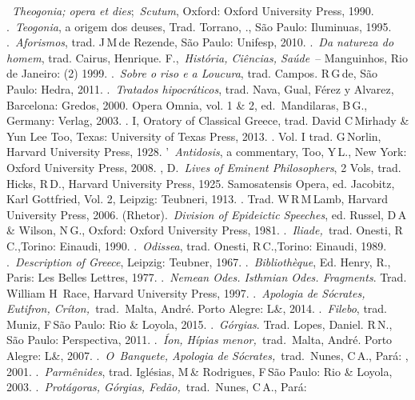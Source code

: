 \begin{bibliohedra}
~\emph{Theogonia; opera et dies};~\emph{Scutum}, Oxford: Oxford
  University Press, 1990.
.~\emph{Teogonia}, a origem dos deuses, Trad. Torrano, .,
  São Paulo: Iluminuas, 1995.
.~\emph{Aforismos}, trad. J\,M\,de Rezende, São Paulo:
  Unifesp, 2010.
.~\emph{Da natureza do homem}, trad. Cairus, Henrique.
  F.,~\emph{História, Ciências, Saúde}~-- Manguinhos, Rio de Janeiro: 
  (2) 1999.
.~\emph{Sobre o riso e a Loucura}, trad. Campos. R\,G\,de,
  São Paulo: Hedra, 2011.
.~\emph{Tratados hipocráticos}, trad. Nava, Gual, Férez y
  Alvarez, Barcelona: Gredos, 2000.
 Opera Omnia, vol. 1 \& 2, ed.~Mandilaras, B\,G., Germany:
  Verlag, 2003.
. I, Oratory of Classical Greece, trad. David C\,Mirhady \&
  Yun Lee Too, Texas: University of Texas Press, 2013.
. Vol. I trad. G\,Norlin, Harvard University Press, 1928.
'~\emph{Antidosis}, a commentary, Too, Y\,L., New York:
  Oxford University Press, 2008.
, D.~\emph{Lives of Eminent Philosophers}, 2 Vols, trad.
  Hicks, R\,D., Harvard University Press, 1925.
 Samosatensis Opera, ed. Jacobitz, Karl Gottfried, Vol. 2,
  Leipzig: Teubneri, 1913.
. Trad. W\,R\,M\,Lamb, Harvard University Press, 2006.
 (Rhetor).~\emph{Division of Epideictic Speeches}, ed. Russel,
  D\,A\,\& Wilson, N\,G., Oxford: Oxford University Press, 1981.
.~\emph{Iliade,~}trad. Onesti, R\,C.,Torino: Einaudi, 1990.
.~\emph{Odissea}, trad. Onesti, R\,C.,Torino: Einaudi, 1989.
.~\emph{Description of Greece}, Leipzig: Teubner, 1967.
.~\emph{Bibliothèque}, Ed. Henry, R., Paris: Les Belles
  Lettres, 1977.
.~\emph{Nemean Odes. Isthmian Odes. Fragments}. Trad. William H\,  Race, Harvard University Press, 1997.
.~\emph{Apologia de Sócrates, Eutifron,
  Críton,~}trad\emph{.}~Malta, André. Porto Alegre: L\&, 2014.
.~\emph{Filebo}, trad. Muniz, F\,São Paulo:  Rio \& Loyola,
  2015.
.~\emph{Górgias}. Trad. Lopes, Daniel. R\,N., São Paulo:
  Perspectiva, 2011.
.\emph{~Íon, Hípias menor,~}trad\emph{.}~Malta, André. Porto
  Alegre: L\&, 2007.
.~\emph{O~Banquete, Apologia de Sócrates,}~trad.~Nunes, C\,A.,
  Pará: , 2001.
.~\emph{Parmênides}, trad. Iglésias, M\,\& Rodrigues, F\,São
  Paulo:  Rio \& Loyola, 2003.
.~\emph{Protágoras, Górgias, Fedão,}~trad.~Nunes, C\,A., Pará:

\end{bibliohedra}
